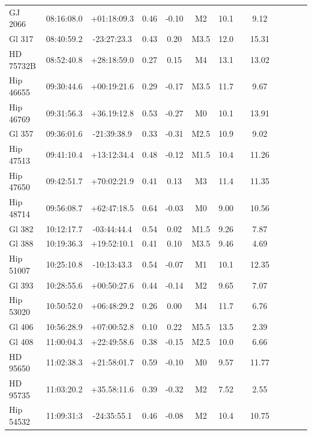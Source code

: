 \begin{landscape}
{\begin{longtable}{l|cccccccccccc}
    GJ 2066 & 08:16:08.0 & +01:18:09.3 & 0.46 & -0.10 & M2 & 10.1 & \citet{Koen10} & 9.12   \\ 
     Gl 317 & 08:40:59.2 & -23:27:23.3 & 0.43 & 0.20 & M3.5 &  12.0 & \citet{VanAltena95} &  15.31   \\ 
    HD 75732B & 08:52:40.8 & +28:18:59.0 & 0.27 & 0.15 & M4 & 13.1 & \citet{Gliese91} & 13.02  \\
  Hip 46655 & 09:30:44.6 & +00:19:21.6 & 0.29 & -0.17 & M3.5 & 11.7 & \citet{Koen10} & 9.67  \\
  Hip 46769 & 09:31:56.3 & +36.19:12.8 & 0.53 & -0.27 & M0 & 10.1 & \citet{Hog00} & 13.91   \\ 
     Gl 357 & 09:36:01.6 & -21:39:38.9 & 0.33 & -0.31 & M2.5 &  10.9 & \citet{Koen10} &  9.02  \\ 
  Hip 47513 & 09:41:10.4 & +13:12:34.4 &  0.48 & -0.12 & M1.5 & 10.4 & \citet{Koen10} & 11.26  \\ 
  Hip 47650 & 09:42:51.7 & +70:02:21.9 & 0.41 & 0.13 & M3 & 11.4 & \citet{Hog00} & 11.35    \\
  Hip 48714 & 09:56:08.7 & +62:47:18.5 & 0.64 & -0.03 & M0 &  9.00 & \citet{Gliese91} & 10.56   \\ 
     Gl 382 & 10:12:17.7 & -03:44:44.4 & 0.54 & 0.02 & M1.5 &  9.26 & \citet{Koen10} & 7.87  \\  
     Gl 388 & 10:19:36.3 & +19:52:10.1 & 0.41 & 0.10 & M3.5 & 9.46 & \citet{Hog00} & 4.69  \\
  Hip 51007 & 10:25:10.8 & -10:13:43.3 & 0.54 & -0.07 & M1 & 10.1 & \citet{Koen10} & 12.35 \\ 
     Gl 393 & 10:28:55.6 & +00:50:27.6 & 0.44 & -0.14 & M2 & 9.65 & \citet{Landolt09} &  7.07   \\
 Hip 53020 & 10:50:52.0 & +06:48:29.2 & 0.26 & 0.00 & M4 & 11.7 & \citet{Landolt92} & 6.76  \\
  Gl 406 & 10:56:28.9 & +07:00:52.8 & 0.10 & 0.22 & M5.5 & 13.5 & \citet{Landolt92} & 2.39   \\
     Gl 408 & 11:00:04.3 & +22:49:58.6 &  0.38 & -0.15 & M2.5 & 10.0 & \citet{Koen10} &  6.66 \\ 
    HD 95650 & 11:02:38.3 & +21:58:01.7 &  0.59 & -0.10 & M0 & 9.57 & \citet{Koen10} & 11.77   \\ 
    HD 95735 & 11:03:20.2 & +35.58:11.6 & 0.39 & -0.32 & M2 & 7.52 & \citet{Oja85} &  2.55  \\ 
  Hip 54532 & 11:09:31:3 & -24:35:55.1 & 0.46 & -0.08 & M2 & 10.4 & \citet{Koen10} & 10.75  \\ 

\end{longtable}}
\end{landscape}
